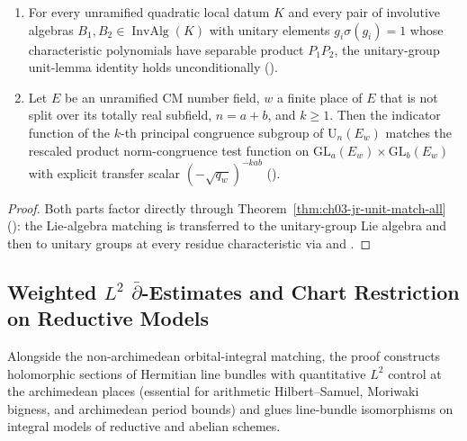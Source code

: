 \begin{corollary}
\label{cor:ch03-unit-lemma-cong}
\begin{enumerate}
  \item For every unramified quadratic local datum $K$ and every pair of
        involutive algebras $B_1, B_2 \in \operatorname{InvAlg}(K)$ with
        unitary elements $g_i \sigma(g_i) = 1$ whose characteristic polynomials
        have separable product $P_1 P_2$, the unitary-group unit-lemma identity
        holds unconditionally
        ().
  \item Let $E$ be an unramified CM number field, $w$ a finite place of $E$
        that is not split over its totally real subfield, $n = a + b$, and
        $k \ge 1$.
        Then the indicator function of the $k$-th principal congruence subgroup
        of $\mathrm{U}_n(E_w)$ matches the rescaled product norm-congruence
        test function on $\mathrm{GL}_a(E_w) \times \mathrm{GL}_b(E_w)$ with
        explicit transfer scalar $(-\sqrt{q_w})^{-k a b}$
        ().
\end{enumerate}
\end{corollary}

\begin{proof}
Both parts factor directly through
Theorem~\ref{thm:ch03-jr-unit-match-all}
(): the Lie-algebra
matching is transferred to the unitary-group Lie algebra and then to unitary
groups at every residue characteristic via
 and
.
\end{proof}

\subsection{Weighted $L^2$ $\bar{\partial}$-Estimates and Chart Restriction on Reductive Models}
\label{subsec:ch03-dbar-charts}

Alongside the non-archimedean orbital-integral matching, the proof constructs
holomorphic sections of Hermitian line bundles with quantitative $L^2$ control
at the archimedean places (essential for arithmetic Hilbert--Samuel, Moriwaki
bigness, and archimedean period bounds) and glues line-bundle isomorphisms on
integral models of reductive and abelian schemes.

